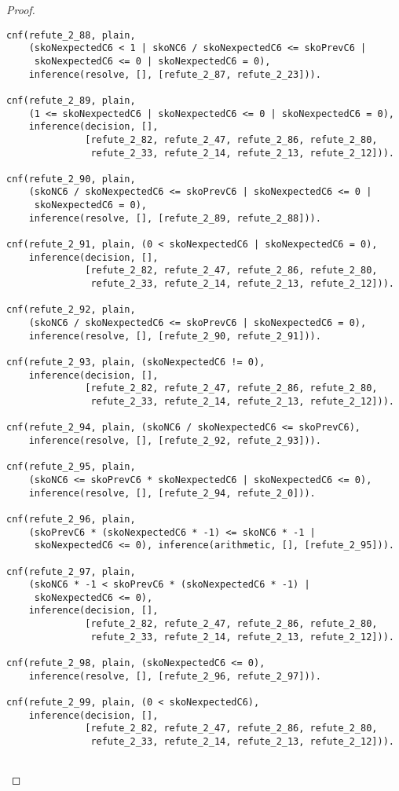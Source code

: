 \begin{proof}
\begin{verbatim}
cnf(refute_2_88, plain,
    (skoNexpectedC6 < 1 | skoNC6 / skoNexpectedC6 <= skoPrevC6 |
     skoNexpectedC6 <= 0 | skoNexpectedC6 = 0),
    inference(resolve, [], [refute_2_87, refute_2_23])).

cnf(refute_2_89, plain,
    (1 <= skoNexpectedC6 | skoNexpectedC6 <= 0 | skoNexpectedC6 = 0),
    inference(decision, [],
              [refute_2_82, refute_2_47, refute_2_86, refute_2_80,
               refute_2_33, refute_2_14, refute_2_13, refute_2_12])).

cnf(refute_2_90, plain,
    (skoNC6 / skoNexpectedC6 <= skoPrevC6 | skoNexpectedC6 <= 0 |
     skoNexpectedC6 = 0),
    inference(resolve, [], [refute_2_89, refute_2_88])).

cnf(refute_2_91, plain, (0 < skoNexpectedC6 | skoNexpectedC6 = 0),
    inference(decision, [],
              [refute_2_82, refute_2_47, refute_2_86, refute_2_80,
               refute_2_33, refute_2_14, refute_2_13, refute_2_12])).

cnf(refute_2_92, plain,
    (skoNC6 / skoNexpectedC6 <= skoPrevC6 | skoNexpectedC6 = 0),
    inference(resolve, [], [refute_2_90, refute_2_91])).

cnf(refute_2_93, plain, (skoNexpectedC6 != 0),
    inference(decision, [],
              [refute_2_82, refute_2_47, refute_2_86, refute_2_80,
               refute_2_33, refute_2_14, refute_2_13, refute_2_12])).

cnf(refute_2_94, plain, (skoNC6 / skoNexpectedC6 <= skoPrevC6),
    inference(resolve, [], [refute_2_92, refute_2_93])).

cnf(refute_2_95, plain,
    (skoNC6 <= skoPrevC6 * skoNexpectedC6 | skoNexpectedC6 <= 0),
    inference(resolve, [], [refute_2_94, refute_2_0])).

cnf(refute_2_96, plain,
    (skoPrevC6 * (skoNexpectedC6 * -1) <= skoNC6 * -1 |
     skoNexpectedC6 <= 0), inference(arithmetic, [], [refute_2_95])).

cnf(refute_2_97, plain,
    (skoNC6 * -1 < skoPrevC6 * (skoNexpectedC6 * -1) |
     skoNexpectedC6 <= 0),
    inference(decision, [],
              [refute_2_82, refute_2_47, refute_2_86, refute_2_80,
               refute_2_33, refute_2_14, refute_2_13, refute_2_12])).

cnf(refute_2_98, plain, (skoNexpectedC6 <= 0),
    inference(resolve, [], [refute_2_96, refute_2_97])).

cnf(refute_2_99, plain, (0 < skoNexpectedC6),
    inference(decision, [],
              [refute_2_82, refute_2_47, refute_2_86, refute_2_80,
               refute_2_33, refute_2_14, refute_2_13, refute_2_12])).


\end{verbatim}
\end{proof}
